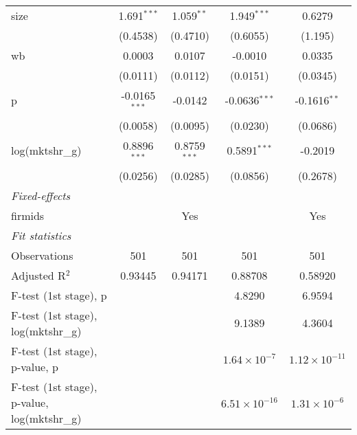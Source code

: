 \begin{tabular}{lcccc}
   size                                         & 1.691$^{***}$   & 1.059$^{**}$           & 1.949$^{***}$          & 0.6279\\   
                                                & (0.4538)        & (0.4710)               & (0.6055)               & (1.195)\\   
   wb                                           & 0.0003          & 0.0107                 & -0.0010                & 0.0335\\   
                                                & (0.0111)        & (0.0112)               & (0.0151)               & (0.0345)\\   
   p                                            & -0.0165$^{***}$ & -0.0142                & -0.0636$^{***}$        & -0.1616$^{**}$\\   
                                                & (0.0058)        & (0.0095)               & (0.0230)               & (0.0686)\\   
   log(mktshr\_g)                               & 0.8896$^{***}$  & 0.8759$^{***}$         & 0.5891$^{***}$         & -0.2019\\   
                                                & (0.0256)        & (0.0285)               & (0.0856)               & (0.2678)\\   
   \midrule
   \emph{Fixed-effects}\\
   firmids                                      &                 & Yes                    &                        & Yes\\  
   \midrule
   \emph{Fit statistics}\\
   Observations                                 & 501             & 501                    & 501                    & 501\\  
   Adjusted R$^2$                               & 0.93445         & 0.94171                & 0.88708                & 0.58920\\  
   F-test (1st stage), p                        &                 &                        & 4.8290                 & 6.9594\\  
   F-test (1st stage), log(mktshr\_g)           &                 &                        & 9.1389                 & 4.3604\\  
   F-test (1st stage), p-value, p               &                 &                        & $1.64\times 10^{-7}$   & $1.12\times 10^{-11}$\\   
   F-test (1st stage), p-value, log(mktshr\_g)  &                 &                        & $6.51\times 10^{-16}$  & $1.31\times 10^{-6}$\\   

\end{tabular}

